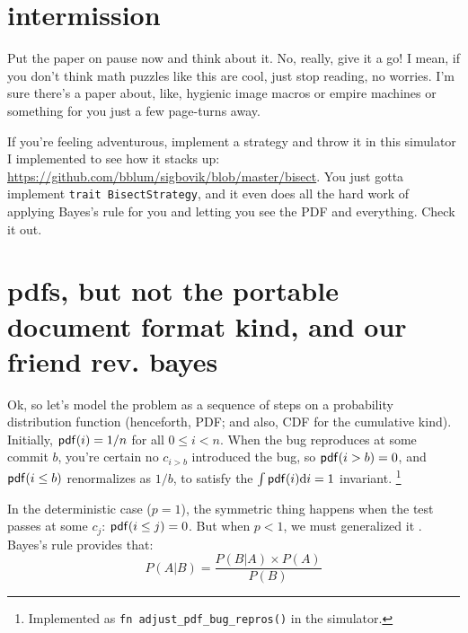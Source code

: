 \documentclass[11pt]{sigplanconf}
\begin{document}

\section{intermission}

Put the paper on pause now and think about it.
No, really, give it a go!
I mean, if you don't think math puzzles like this are cool, just stop reading, no worries.
I'm sure there's a paper about, like, hygienic image macros or empire machines or something for you just a few page-turns away.

If you're feeling adventurous,
implement a strategy and throw it in this simulator I implemented to see how it stacks up:
\url{https://github.com/bblum/sigbovik/blob/master/bisect}.
You just gotta implement {\tt trait BisectStrategy},
and it even does all the hard work of applying Bayes's rule
for you and letting you see the PDF and everything.
Check it out.



\section{pdfs, but not the portable document format kind, and our friend rev. bayes}

Ok, so let's model the problem as a sequence of steps on a probability distribution function
(henceforth, PDF; and also, CDF for the cumulative kind).
Initially, $\mathsf{pdf}(i) = 1/n$ for all $0 \le i < n$.
When the bug reproduces at some commit $b$,
you're certain no $c_{i>b}$ introduced the bug, so $\mathsf{pdf}(i>b) = 0$,
and $\mathsf{pdf}(i\le b)$ renormalizes as $1/b$, to satisfy the $\int \mathsf{pdf}(i) \text{d} i = 1$ invariant.%
\footnote{Implemented as {\tt fn adjust\_pdf\_bug\_repros()} in the simulator.}

In the deterministic case ($p=1$),
the symmetric thing happens when the test passes at some $c_j$: $\mathsf{pdf}(i\le j) = 0$.
But when $p<1$, we must generalized it \cite{mario3}. Bayes's rule provides that:
\[
P(A|B) = \frac{P(B|A) \times P(A)}{P(B)}
\]

\newcommand\renorm[1]{\ensuremath{\mathcal{R}_{#1}}\xspace}
\end{document}
